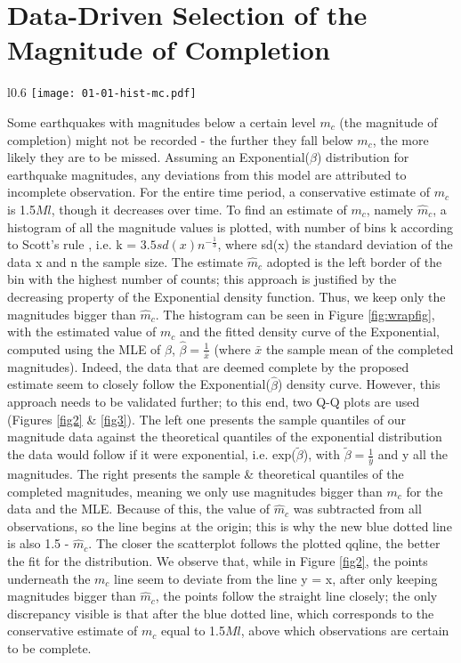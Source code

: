 \documentclass[a4paper]{article}
\begin{document}
\section*{\centering\textnormal{Data-Driven Selection of the Magnitude of Completion}}
\begin{wrapfigure}{l}{0.6\textwidth}
\texttt{[image: 01-01-hist-mc.pdf]} 
\caption{}
\label{fig:wrapfig}
\end{wrapfigure}
Some earthquakes with magnitudes below a certain level $m_c$ (the magnitude of completion) might not be recorded - the further they fall below $m_c$, the more likely they are to be missed. Assuming an Exponential($\beta$) distribution for earthquake magnitudes, any deviations from this model are attributed to incomplete observation. For the entire time period, a conservative estimate of $m_c$ is 1.5$Ml$, though it decreases over time. To find an estimate of $m_c$, namely $\hat m_c$, a histogram of all the magnitude values is plotted, with number of bins k according to Scott's rule \cite{hist}, i.e. k = $3.5sd(x)n^{-\frac{1}{3}}$, where sd(x) the standard deviation of the data x and n the sample size. The estimate $\hat m_c$ adopted is the left border of the bin with the highest number of counts; this approach is justified by the decreasing property of the Exponential density function. Thus, we keep only the magnitudes bigger than $\hat m_c$. The histogram can be seen in Figure \ref{fig:wrapfig}, with the estimated value of $m_c$ and the fitted density curve of the Exponential, computed using the MLE of $\beta$, $\hat \beta = \frac{1}{\bar x}$ (where $\bar x$ the sample mean of the completed magnitudes). Indeed, the data that are deemed complete by the proposed estimate seem to closely follow the Exponential($\hat \beta$) density curve. However, this approach needs to be validated further; to this end, two Q-Q plots are used (Figures \ref{fig2} \& \ref{fig3}). The left one presents the sample quantiles of our magnitude data against the theoretical quantiles of the exponential distribution the data would follow if it were exponential, i.e. exp($\tilde \beta$), with $\tilde \beta = \frac{1}{\bar y}$ and y all the magnitudes. The right presents the sample \& theoretical quantiles of the completed magnitudes, meaning we only use magnitudes bigger than $m_c$ for the data and the MLE. Because of this, the value of $\hat m_c$ was subtracted from all observations, so the line begins at the origin; this is why the new blue dotted line is also 1.5 - $\hat m_c$. The closer the scatterplot follows the plotted qqline, the better the fit for the distribution. We observe that, while in Figure \ref{fig2}, the points underneath the $m_c$ line seem to deviate from the line y = x, after only keeping magnitudes bigger than $\hat m_c$, the points follow the straight line closely; the only discrepancy visible is that after the blue dotted line, which corresponds to the conservative estimate of $m_c$ equal to 1.5$Ml$, above which observations are certain to be complete.\\
\end{document}
